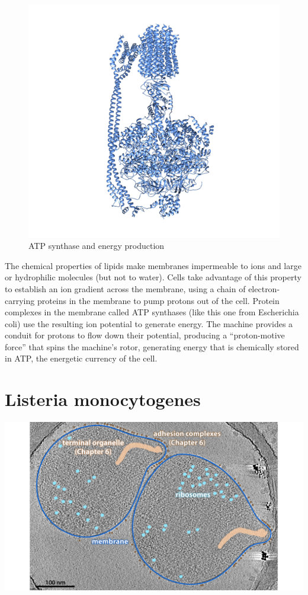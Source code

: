 \documentclass[]{tufte-book}
\begin{document}
\begin{figure}
\includegraphics{img/02_schematic/2_1_2_ATPsynthase} \caption[ATP synthase and energy production]{ATP synthase and energy production}\label{fig:2-1-2}
\end{figure}

The chemical properties of lipids make membranes impermeable to ions and
large or hydrophilic molecules (but not to water). Cells take advantage
of this property to establish an ion gradient across the membrane, using
a chain of electron-carrying proteins in the membrane to pump protons
out of the cell. Protein complexes in the membrane called ATP synthases
(like this one from Escherichia coli) use the resulting ion potential to
generate energy. The machine provides a conduit for protons to flow down
their potential, producing a ``proton-motive force'' that spins the
machine's rotor, generating energy that is chemically stored in ATP, the
energetic currency of the cell.

\section{Listeria monocytogenes}\label{listeria-monocytogenes}

\includegraphics{img/02_static/2_1_Mgenitalium}
\end{document}
